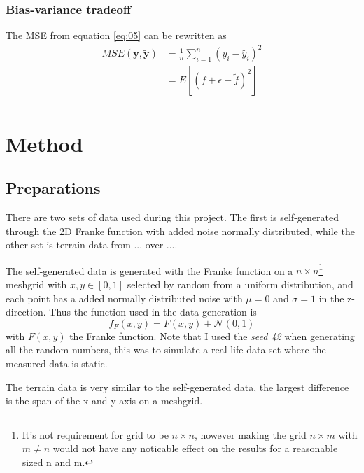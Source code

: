 \documentclass[uio,jmp,amsmath,amssymb,reprint,nofootinbib]{revtex4-1}
\numberwithin{equation}{section}
\newcommand{\lsb}{\left[}
\newcommand{\rsb}{\right]}
\begin{document}
\subsubsection{Bias-variance tradeoff}

The MSE from equation \ref{eq:05} can be rewritten as
\begin{align}
     MSE(\bm{y}, \bm{\tilde{y}}) &= \frac{1}{n}\sum_{i=1}^n(y_i - \tilde{y_i})^2\\
     &= E\lsb (f+\epsilon-\tilde{f})^2\rsb\\
\end{align}

\section{Method}\label{sec:Method}

\subsection{Preparations}

There are two sets of data used during this project. The first is self-generated through the 2D Franke function with added noise normally distributed, while the other set is terrain data from ... over ....

The self-generated data is generated with the Franke function on a \(n\times n\)\footnote{It's not requirement for grid to be \(n\times n\), however making the grid \(n\times m\) with \(m\neq n\) would not have any noticable effect on the results for a reasonable sized n and m.} meshgrid with \(x,y\in [0,1]\) selected by random from a uniform distribution, and each point has a added normally distributed noise with \(\mu = 0\) and \(\sigma = 1\) in the z-direction. Thus the function used in the data-generation is
\begin{equation}
f_{F}(x,y) = F(x, y) + \mathcal{N}(0,1)
\end{equation}
with \(F(x,y)\) the Franke function. Note that I used the \textit{seed 42} when generating all the random numbers, this was to simulate a real-life data set where the measured data is static.

The terrain data is very similar to the self-generated data, the largest difference is the span of the x and y axis on a meshgrid.
\end{document}
